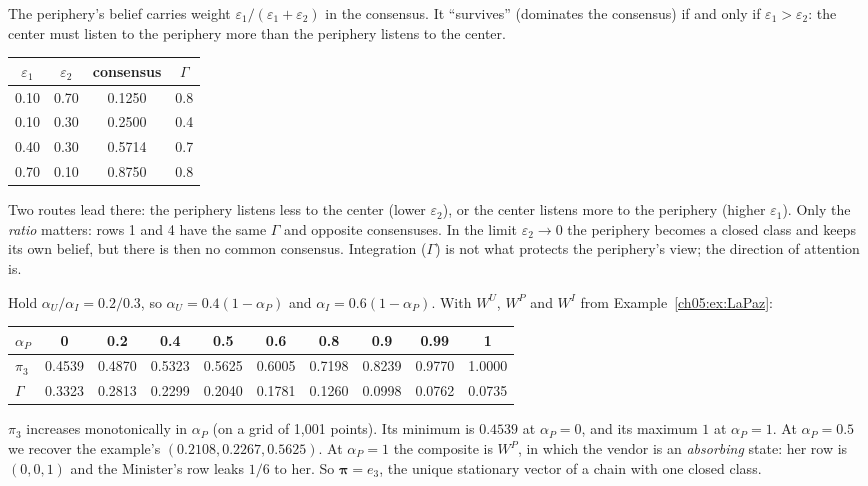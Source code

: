 \documentclass[../solutions_manual.tex]{subfiles}
\begin{document}
 The periphery's belief carries weight $\varepsilon_1/(\varepsilon_1 + \varepsilon_2)$ in the consensus. It ``survives'' (dominates the consensus) if and only if $\varepsilon_1 > \varepsilon_2$: the center must listen to the periphery more than the periphery listens to the center.
\begin{center}
\begin{tabular}{cccc}
\toprule
$\varepsilon_1$ & $\varepsilon_2$ & consensus & $\Gamma$\\
\midrule
0.10 & 0.70 & 0.1250 & 0.8\\
0.10 & 0.30 & 0.2500 & 0.4\\
0.40 & 0.30 & 0.5714 & 0.7\\
0.70 & 0.10 & 0.8750 & 0.8\\
\bottomrule
\end{tabular}
\end{center}
Two routes lead there: the periphery listens less to the center (lower $\varepsilon_2$), or the center listens more to the periphery (higher $\varepsilon_1$). Only the \emph{ratio} matters: rows 1 and 4 have the same $\Gamma$ and opposite consensuses. In the limit $\varepsilon_2 \to 0$ the periphery becomes a closed class and keeps its own belief, but there is then no common consensus. Integration ($\Gamma$) is not what protects the periphery's view; the direction of attention is.


 Hold $\alpha_U/\alpha_I = 0.2/0.3$, so $\alpha_U = 0.4(1 - \alpha_P)$ and $\alpha_I = 0.6(1-\alpha_P)$. With $W^U$, $W^P$ and $W^I$ from Example~\ref{ch05:ex:LaPaz}:
\begin{center}
\begin{tabular}{lccccccccc}
\toprule
$\alpha_P$ & 0 & 0.2 & 0.4 & 0.5 & 0.6 & 0.8 & 0.9 & 0.99 & 1\\
\midrule
$\pi_3$ & 0.4539 & 0.4870 & 0.5323 & 0.5625 & 0.6005 & 0.7198 & 0.8239 & 0.9770 & 1.0000\\
$\Gamma$ & 0.3323 & 0.2813 & 0.2299 & 0.2040 & 0.1781 & 0.1260 & 0.0998 & 0.0762 & 0.0735\\
\bottomrule
\end{tabular}
\end{center}
$\pi_3$ increases monotonically in $\alpha_P$ (on a grid of 1{,}001 points). Its minimum is $0.4539$ at $\alpha_P = 0$, and its maximum $1$ at $\alpha_P = 1$. At $\alpha_P = 0.5$ we recover the example's $(0.2108, 0.2267, 0.5625)$. At $\alpha_P = 1$ the composite is $W^P$, in which the vendor is an \emph{absorbing} state: her row is $(0, 0, 1)$ and the Minister's row leaks $1/6$ to her. So $\boldsymbol\pi = e_3$, the unique stationary vector of a chain with one closed class.
\end{document}
